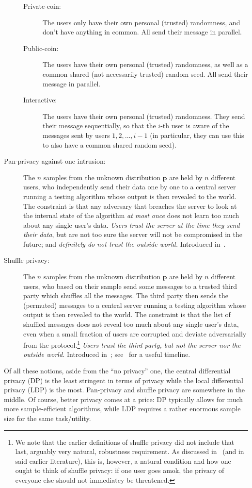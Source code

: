 \documentclass[10pt]{article}
\newcommand{\ns}{n}
\newcommand{\p}{\mathbf{p}}
\begin{document}
\begin{description}
    \begin{description}
      \item[Private-coin:] The users only have their own personal (trusted) randomness, and don't have anything in common. All send their message in parallel.
      \item[Public-coin:] The users have their own personal (trusted) randomness, as well as a common shared (not necessarily trusted) random seed. All send their message in parallel.
      \item[Interactive:] The users have their own personal (trusted) randomness. They send their message sequentially, so that the $i$-th user is aware of the messages sent by users $1,2,\dots,i-1$ (in particular, they can use this to also have a common shared random seed).
    \end{description}
  \item[Pan-privacy against one intrusion:] The $\ns$ samples from the unknown distribution $\p$ are held by $\ns$ different users, who independently send their data one by one to a central server running a testing algorithm whose output is then revealed to the world. The constraint is that any adversary that breaches the server to look at the internal state of the algorithm \emph{at most once} does not learn too much about any single user's data. \emph{Users trust the server at the time they send their data}, but are not too sure the server will not be compromised in the future; and \emph{definitely do not trust the outside world.} Introduced in~\cite{DworkNPRY10}.
  \item[Shuffle privacy:] The $\ns$ samples from the unknown distribution $\p$ are held by $\ns$ different users, who based on their sample send some messages to a trusted third party which shuffles all the messages. The third party then sends the (permuted) messages to a  central server running a testing algorithm whose output is then revealed to the world. The constraint is that the list of shuffled messages does not reveal too much about any single user's data, even when a small fraction of users are corrupted and deviate adversarially from the protocol.\footnote{We note that the earlier definitions of shuffle privacy did not include that last, arguably very natural, robustness requirement. As discussed in~\cite{BalcerCJM20} (and in said earlier literature), this is, however, a natural condition and how one ought to think of shuffle privacy: if one user goes amok, the privacy of everyone else should not immediatey be threatened.} \emph{Users trust the third party, but not the server nor the outside world.} Introduced in~\cite{CheuSUZZ19}; see~\cite{Cheu2020} for a useful timeline.
\end{description}
Of all these notions, aside from the ``no privacy'' one, the central differential privacy (DP) is the least stringent in terms of privacy while the local differential privacy (LDP) is the most. Pan-privacy and shuffle privacy are somewhere in the middle. Of course, better privacy comes at a price: DP typically allows for much more sample-efficient algorithms, while LDP requires a rather enormous sample size for the same task/utility.
\end{document}
